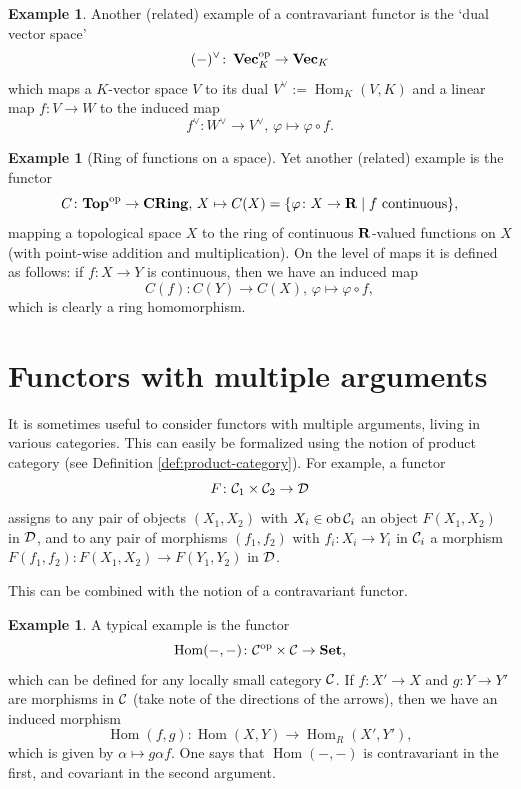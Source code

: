 \documentclass[11pt]{amsbook}
\DeclareMathOperator\Hom{Hom}
\renewcommand{\Vec}{\operatorname{{\bf{Vec}}}}
\DeclareMathOperator\ob{ob}
\def\opp{\mathrm{op}}
\def\Set{\mathbf{Set}}
\def\Top{\mathbf{Top}}
\def\CRing{\mathbf{CRing}}
\theoremstyle{plain}
\theoremstyle{definition}
\newtheorem{example}[theorem]{Example}
\begin{document}
\begin{example}
Another (related) example of a contravariant functor is the `dual vector space'
\[
	(-)^\vee\colon \Vec_K^\opp \to \Vec_K
\]
which maps a $K$-vector space $V$ to its dual $V^{\vee} := \Hom_K(V,K)$ and a linear map
$f\colon V\to W$ to the induced map
\[
	f^\vee\colon W^\vee \to V^\vee,\,
	\varphi \mapsto \varphi\circ f.
\]
\end{example}

\begin{example}[Ring of functions on a space]\label{exa:functions-on-a-space}
Yet another (related) example is the functor
\[
	C\colon \Top^\opp \to \CRing,\, X \mapsto C(X) = \{ \varphi\colon X\to \bR \mid \text{$f$ continuous} \},
\]
mapping a topological space $X$ to the ring of continuous ${\mathbf{R}}$-valued functions on $X$ (with point-wise addition and multiplication). On the level of maps it is defined as follows: if $f\colon X\to Y$ is continuous, then we have an induced map
\[
	C(f) \colon C(Y) \to C(X),\, \varphi \mapsto \varphi\circ f,
\]
which is clearly a ring homomorphism. 
\end{example}

\section{Functors with multiple arguments}


It is sometimes useful to consider functors with multiple arguments, living in various categories. This can easily be formalized using the notion of product category (see Definition \ref{def:product-category}). For example, a functor
\[
	F\colon {\mathcal{C}}_1 \times {\mathcal{C}}_2 \to {\mathcal{D}}
\]
assigns to any pair of objects $(X_1,X_2)$ with $X_i\in \ob \cC_i$ an object $F(X_1,X_2)$ in ${\mathcal{D}}$, and to any pair of morphisms $(f_1,f_2)$ with $f_i\colon X_i\to Y_i$ in ${\mathcal{C}}_i$ a morphism $F(f_1,f_2) \colon F(X_1,X_2) \to F(Y_1,Y_2)$ in ${\mathcal{D}}$. 

This can be combined with the notion of a contravariant functor. 

\begin{example}\label{exa:hom-in-two-arguments}
A typical example is the functor
\[
	\Hom(-,-) \colon \cC^\opp \times \cC \to \Set,
\]
which can be defined for any locally small category ${\mathcal{C}}$. If $f\colon X'\to X$ and $g\colon Y\to Y'$ are morphisms in ${\mathcal{C}}$ (take note of the directions of the arrows), then we have an induced morphism
\[	
	\Hom(f,g)\colon \Hom(X,Y) \to \Hom_R(X',Y'),
\]
which is given by $\alpha \mapsto g\alpha f$. One says that $\Hom(-,-)$ is contravariant in the first, and covariant in the second argument.
\end{example}
\end{document}
